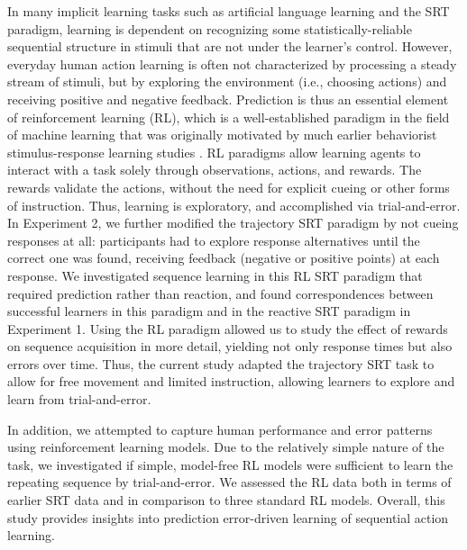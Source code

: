 \documentclass[man,floatsintext]{apa6}
\begin{document}
In many implicit learning tasks such as artificial language learning and the SRT paradigm, learning is dependent on recognizing some statistically-reliable sequential structure in stimuli that are not under the learner's control. However, everyday human action learning is often not characterized by processing a steady stream of stimuli, but by exploring the environment (i.e., choosing actions) and receiving positive and negative feedback. Prediction is thus an essential element of reinforcement learning (RL), which is a well-established paradigm in the field of machine learning \cite{Sutton:1998} that was originally motivated by much earlier behaviorist stimulus-response learning studies \cite{Skinner:1950}. RL paradigms allow learning agents to interact with a task solely through observations, actions, and rewards. The rewards validate the actions, without the need for explicit cueing or other forms of instruction. Thus, learning is exploratory, and accomplished via trial-and-error. In Experiment 2, we further modified the trajectory SRT paradigm by not cueing responses at all: participants had to explore response alternatives until the correct one was found, receiving feedback (negative or positive points) at each response. We investigated sequence learning in this RL SRT paradigm that required prediction rather than reaction, and found correspondences between successful learners in this paradigm and in the reactive SRT paradigm in Experiment 1. Using the RL paradigm allowed us to study the effect of rewards on sequence acquisition in more detail, yielding not only response times but also errors over time. Thus, the current study adapted the trajectory SRT task to allow for free movement and limited instruction, allowing learners to explore and learn from trial-and-error. 

In addition, we attempted to capture human performance and error patterns using reinforcement learning models. Due to the relatively simple nature of the task, we investigated if simple, model-free RL models were sufficient to learn the repeating sequence by trial-and-error. We assessed the RL data both in terms of earlier SRT data and in comparison to three standard RL models. Overall, this study provides insights into prediction error-driven learning of sequential action learning. 

\end{document}
